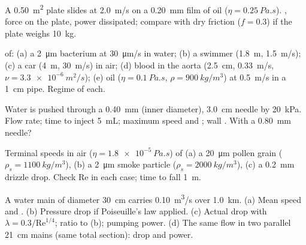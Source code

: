 \begin{exercise}[$\star$]\label{exo:b2:viscous-flows:1}
A \qty{0.50}{m^2} plate slides at \qty{2.0}{m/s} on a \qty{0.20}{mm} film of oil
($\eta = \qty{0.25}{Pa.s}$). , force on the plate, power
dissipated; compare with dry friction ($f = 0.3$) if the plate weighs
\qty{10}{kg}.
\end{exercise}

\begin{exercise}[$\star$]\label{exo:b2:viscous-flows:2}
 of: (a) a \qty{2}{\micro m} bacterium at \qty{30}{\micro m/s} in
water; (b) a swimmer (\qty{1.8}{m}, \qty{1.5}{m/s}); (c) a car (\qty{4}{m},
\qty{30}{m/s}) in air; (d) blood in the aorta (\qty{2.5}{cm}, \qty{0.33}{m/s},
$\nu = \qty{3.3e-6}{m^2/s}$); (e) oil ($\eta = \qty{0.1}{Pa.s}$, $\rho =
\qty{900}{kg/m^3}$) at \qty{0.5}{m/s} in a \qty{1}{cm} pipe. Regime of each.
\end{exercise}

\begin{exercise}[$\star$]\label{exo:b2:viscous-flows:3}
Water is pushed through a \qty{0.40}{mm} (inner diameter), \qty{3.0}{cm}
needle by \qty{20}{kPa}. Flow rate; time to inject \qty{5}{mL}; maximum speed
and ; wall . With a \qty{0.80}{mm} needle?
\end{exercise}

\begin{exercise}[$\star$]\label{exo:b2:viscous-flows:4}
Terminal speeds in air ($\eta = \qty{1.8e-5}{Pa.s}$) of (a) a \qty{20}{\micro m}
pollen grain ($\rho_s = \qty{1100}{kg/m^3}$), (b) a \qty{2}{\micro m} smoke
particle ($\rho_s = \qty{2000}{kg/m^3}$), (c) a \qty{0.2}{mm} drizzle drop.
Check $\mathrm{Re}$ in each case; time to fall \qty{1}{m}.
\end{exercise}

\begin{exercise}[$\star\star$]\label{exo:b2:viscous-flows:5}
A water main of diameter \qty{30}{cm} carries \qty{0.10}{m^3/s} over
\qty{1.0}{km}. (a) Mean speed and . (b) Pressure drop if
Poiseuille's law applied. (c) Actual drop with $\lambda = 0.3/\mathrm{Re}^{1/4}$;
ratio to (b); pumping power. (d) The same flow in two parallel
\qty{21}{cm} mains (same total section): drop and power.
\end{exercise}

